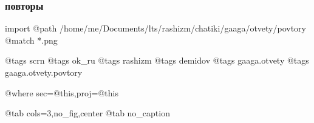  
 
 
 
 

\subsubsection{повторы}

\ifcmt
  import
    @path /home/me/Documents/lts/rashizm/chatiki/gaaga/otvety/povtory
    @match *.png

    @tags scrn
    @tags ok_ru
    @tags rashizm
    @tags demidov
    @tags gaaga.otvety
    @tags gaaga.otvety.povtory

    @where sec=@this,proj=@this
  
    @tab cols=3,no_fig,center
    @tab no_caption
\fi
